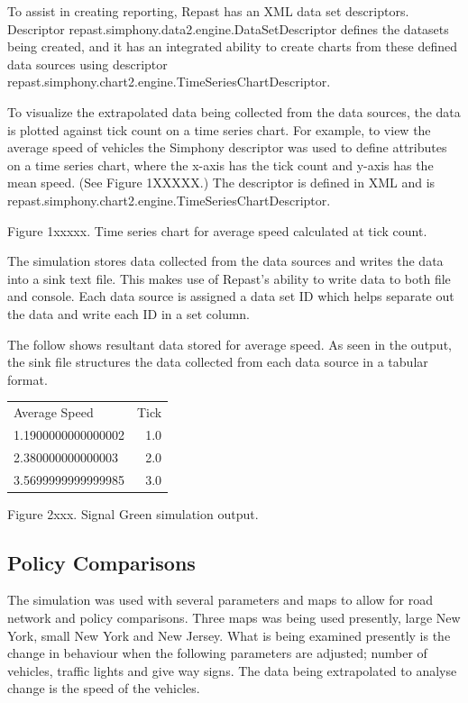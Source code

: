 \documentclass[11pt]{article}
\begin{document}
\begin{enumerate}
To assist in creating reporting, Repast has an XML data set descriptors. Descriptor repast.simphony.data2.engine.DataSetDescriptor defines the datasets being created, and it has an integrated ability to create charts from these defined data sources using descriptor repast.simphony.chart2.engine.TimeSeriesChartDescriptor.

To visualize the extrapolated data being collected from the data sources, the data is plotted against tick count on a time series chart. For example, to view the average speed of vehicles the Simphony descriptor was used to define attributes on a time series chart, where the x-axis has the tick count and y-axis has the mean speed. (See Figure 1XXXXX.) The descriptor is defined in XML and is repast.simphony.chart2.engine.TimeSeriesChartDescriptor.

 

Figure 1xxxxx. Time series chart for average speed calculated at tick count.

The simulation stores data collected from the data sources and writes the data into a sink text file. This makes use of Repast’s ability to write data to both file and console. Each data source is assigned a data set ID which helps separate out the data and write each ID in a set column. 

The follow shows resultant data stored for average speed. As seen in the output, the sink file structures the data collected from each data source in a tabular format. 

\begin{center}
\begin{tabular}{ l | r  }
\hline
Average Speed & Tick \\
1.1900000000000002 & 1.0 \\
2.380000000000003  &  2.0 \\
3.5699999999999985 & 3.0 \\
\hline
\end{tabular}
\end{center}

Figure 2xxx. Signal Green simulation output.




\subsection{Policy Comparisons}

The simulation was used with several parameters and maps to allow for road network and policy comparisons. Three maps was being used presently, large New York, small New York and New Jersey. What is being examined presently is the change in behaviour when the following parameters are adjusted; number of vehicles, traffic lights and give way signs. The data being extrapolated to analyse change is the speed of the vehicles.



\end{enumerate}
\end{document}
